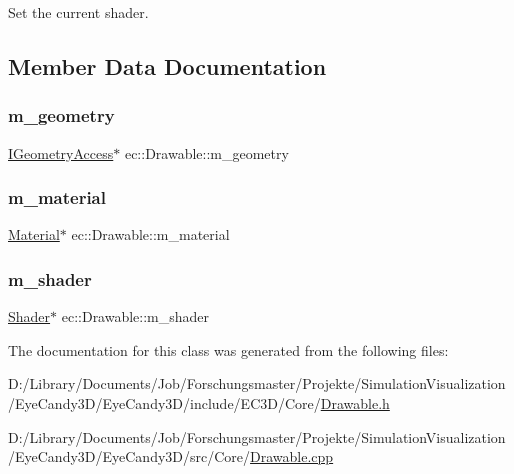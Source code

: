 Set the current shader. 

\subsection{Member Data Documentation}
\mbox{\label{classec_1_1_drawable_a12fc649448250ab8a16e862495d22752}} 
\subsubsection{\texorpdfstring{m\+\_\+geometry}{m\_geometry}}
{\footnotesize\ttfamily \mbox{\hyperlink{classec_1_1_i_geometry_access}{I\+Geometry\+Access}}$\ast$ ec\+::\+Drawable\+::m\+\_\+geometry\hspace{0.3cm}{\ttfamily [protected]}}

\mbox{\label{classec_1_1_drawable_ae95da71e937a2008a84300b8d29ac052}} 
\subsubsection{\texorpdfstring{m\+\_\+material}{m\_material}}
{\footnotesize\ttfamily \mbox{\hyperlink{classec_1_1_material}{Material}}$\ast$ ec\+::\+Drawable\+::m\+\_\+material\hspace{0.3cm}{\ttfamily [protected]}}

\mbox{\label{classec_1_1_drawable_aee71f07b65189391a7a465d880d744e3}} 
\subsubsection{\texorpdfstring{m\+\_\+shader}{m\_shader}}
{\footnotesize\ttfamily \mbox{\hyperlink{classec_1_1_shader}{Shader}}$\ast$ ec\+::\+Drawable\+::m\+\_\+shader\hspace{0.3cm}{\ttfamily [protected]}}



The documentation for this class was generated from the following files\+:\begin{DoxyCompactItemize}
\item 
D\+:/\+Library/\+Documents/\+Job/\+Forschungsmaster/\+Projekte/\+Simulation\+Visualization/\+Eye\+Candy3\+D/\+Eye\+Candy3\+D/include/\+E\+C3\+D/\+Core/\mbox{\hyperlink{_drawable_8h}{Drawable.\+h}}\item 
D\+:/\+Library/\+Documents/\+Job/\+Forschungsmaster/\+Projekte/\+Simulation\+Visualization/\+Eye\+Candy3\+D/\+Eye\+Candy3\+D/src/\+Core/\mbox{\hyperlink{_drawable_8cpp}{Drawable.\+cpp}}\end{DoxyCompactItemize}
